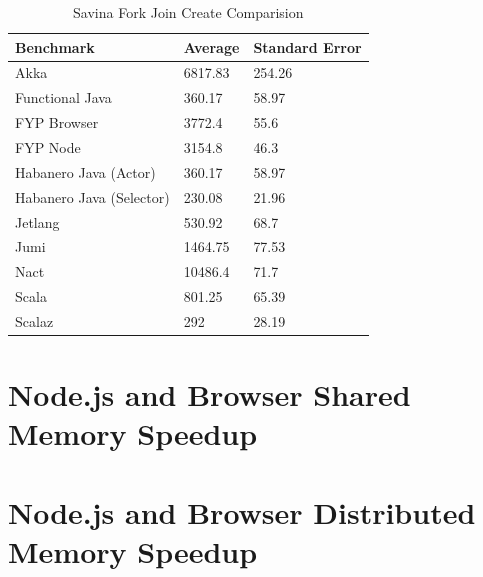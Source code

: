 \documentclass[oneside]{um-fict}
\begin{document}
\begin{table}[H]
    \begin{center}
        \begin{tabular}{|l|ll|}
        \hline
        Benchmark                & Average & Standard Error \\ \hline
        Akka                     & 6817.83 & 254.26         \\
        Functional Java          & 360.17  & 58.97          \\
        FYP Browser              & 3772.4  & 55.6           \\
        FYP Node                 & 3154.8  & 46.3           \\
        Habanero Java (Actor)    & 360.17  & 58.97          \\
        Habanero Java (Selector) & 230.08  & 21.96          \\
        Jetlang                  & 530.92  & 68.7           \\
        Jumi                     & 1464.75 & 77.53          \\
        Nact                     & 10486.4 & 71.7           \\
        Scala                    & 801.25  & 65.39          \\
        Scalaz                   & 292     & 28.19          \\ \hline
        \end{tabular}
        \caption{Savina Fork Join Create Comparision}\label{tab:savinafjcreate}
    \end{center}
\end{table}
\section{Node.js and Browser Shared Memory Speedup}
\section{Node.js and Browser Distributed Memory Speedup}
\end{document}

